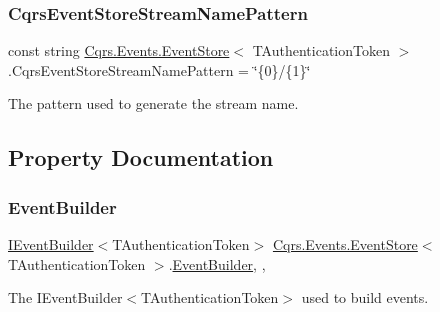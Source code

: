 \subsubsection{\texorpdfstring{Cqrs\+Event\+Store\+Stream\+Name\+Pattern}{CqrsEventStoreStreamNamePattern}}
{\footnotesize\ttfamily const string \hyperlink{classCqrs_1_1Events_1_1EventStore}{Cqrs.\+Events.\+Event\+Store}$<$ T\+Authentication\+Token $>$.Cqrs\+Event\+Store\+Stream\+Name\+Pattern = \char`\"{}\{0\}/\{1\}\char`\"{}\hspace{0.3cm}{\ttfamily [protected]}}



The pattern used to generate the stream name. 



\subsection{Property Documentation}
\mbox{\label{classCqrs_1_1Events_1_1EventStore_a05393aedf2eae4b2eeae3977e7f1c6f9_a05393aedf2eae4b2eeae3977e7f1c6f9}} 
\subsubsection{\texorpdfstring{Event\+Builder}{EventBuilder}}
{\footnotesize\ttfamily \hyperlink{interfaceCqrs_1_1Events_1_1IEventBuilder}{I\+Event\+Builder}$<$T\+Authentication\+Token$>$ \hyperlink{classCqrs_1_1Events_1_1EventStore}{Cqrs.\+Events.\+Event\+Store}$<$ T\+Authentication\+Token $>$.\hyperlink{classCqrs_1_1Events_1_1EventBuilder}{Event\+Builder}\hspace{0.3cm}{\ttfamily [get]}, {\ttfamily [set]}, {\ttfamily [protected]}}



The I\+Event\+Builder$<$\+T\+Authentication\+Token$>$ used to build events. 

\mbox{\label{classCqrs_1_1Events_1_1EventStore_a24f17302c069058e5814dedfb614d599_a24f17302c069058e5814dedfb614d599}} 
